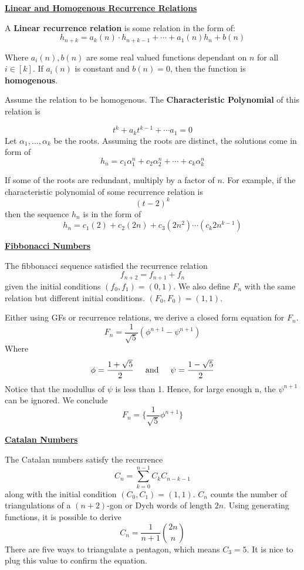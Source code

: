 \documentclass{article}
\newcommand{\new}[1]{
    \vspace{2mm}
    \noindent
    \textbf{
    \underline{#1}}
}
\newcommand{\textAnd}{
    {
        \hspace{5mm}
        \textrm{and}
        \hspace{5mm}
    }
}
\newcommand{\m}{
    \cdot
}
\begin{document}
\new{Linear and Homogenous Recurrence Relations}

A \textbf{Linear recurrence relation} is some relation in 
the form of:
\[
h_{n + k} = a_{k}(n) \m h_{n + k - 1} + \cdots + a_1(n) h_{n} + b(n) 
\]

Where $a_i(n), b(n)$ are some real valued functions 
dependant on $n$ for all $i \in [k]$. If $a_i(n)$ 
is constant and $b(n) = 0$, then the function is 
\textbf{homogenous}.

Assume the relation to be homogenous. The 
\textbf{Characteristic Polynomial} of this relation 
is 

\[
  t^k + a_k t^{k - 1} + \cdots a_1 = 0
\]
Let $\alpha_1, \dots, \alpha_k $ be the roots. 
Assuming the roots are distinct, the solutions 
come in form of 
\[
    h_n = c_1 \alpha_1^{n}
    + c_2 \alpha_2^{n}
    + \cdots 
    + c_k \alpha_k^{n}
\]

If some of the roots are redundant, multiply 
by a factor of $n$. For example, if the characteristic 
polynomial of some recurrence relation is 
\[
    (t - 2)^k
\]
then the sequence $h_n$ is in the form of 
\[
    h_n = c_1 (2) + c_2 (2 n) + c_3 (2 n^2) \cdots (c_k 2n^{k - 1})
\]

\new{Fibbonacci Numbers} 

The fibbonacci sequence satisfied the recurrence relation 
\[
    f_{n+2} = f_{n+ 1} + f_n 
\]
given the initial conditions $(f_0, f_1) = (0, 1)$. 
We also define $F_n$ with the same relation but 
different initial conditions. $(F_0, F_0) = (1, 1)$. 

Either using GFs or recurrence relations, 
we derive a closed form equation for $F_n$. 
\[
  F_n = \frac 1 {\sqrt{5}}   \left(
    \phi^{n + 1}
    - \psi^{n + 1}
  \right)
\]
Where 
\[
    \phi = \frac {1 + \sqrt{5}} 2 
    \textAnd 
    \psi = \frac {1 - \sqrt{5}} 2
\]
Notice that the modullus of $\psi$ is less than 1. 
Hence, for large enough n, the $\psi^{n+1}$ can 
be ignored. We conclude 
\[
    F_n = \bigg\{\frac 1 {\sqrt 5}\phi^{n + 1}\bigg\}
\]

\new{Catalan Numbers} 

The Catalan numbers satisfy the recurrence 
\[
    C_n = \sum_{k = 0}^{n -1} C_k C_{n -k - 1}
\]
along with the initial condition $(C_0, C_1) = (1, 1)$. 
$C_n$ counts the number of triangulations of a 
$(n + 2)$-gon or Dych words of length $2n$. 
Using generating functions, it is possible to derive 
\[
    C_n = \frac 1 {n + 1} \binom{2n}{n}
\] 
There are five ways to triangulate a pentagon, which 
means $C_3 = 5$. It is nice to plug this value to 
confirm the equation. 
\end{document}
